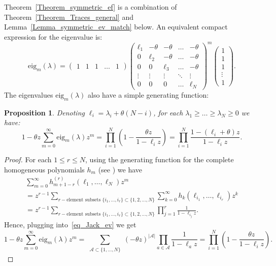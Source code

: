 \documentclass[11pt]{article}
\newtheorem{prop}[theo]{Proposition}
\theoremstyle{definition}
\numberwithin{equation}{section}
\begin{document}
Theorem~\ref{Theorem_symmetric_ef} is a combination of Theorem~\ref{Theorem_Traces_general} and Lemma~\ref{Lemma_symmetric_ev_match} below.
An equivalent compact expression for the eigenvalue is:
\begin{equation}
\label{eq_x7}
 \mathrm{eig}_m(\lambda)=\begin{pmatrix}
1 & 1 & 1 & \ldots & 1
\end{pmatrix}
\begin{pmatrix}
\ell_{1} & -\theta & -\theta & \ldots & -\theta\\
0 & \ell_{2} & -\theta & \ldots & -\theta\\
0 & 0 & \ell_{3} & \ldots & -\theta\\
\vdots & \vdots & \vdots & \ddots & \vdots\\
0 & 0 & 0 & \ldots &  \ell_{N}
\end{pmatrix}
^{m}
\begin{pmatrix}
1\\
1\\
1\\
\vdots\\
1
\end{pmatrix}.
\end{equation}
The eigenvalues $\mathrm{eig}_m(\lambda)$ also have a simple generating function:
\begin{prop} \label{Proposition_sym_gen_funct} Denoting $\ell_i=\lambda_i+\theta(N-i)$, for each $\lambda_1\ge \dots\ge \lambda_N\ge 0$ we have:
\begin{equation}
\label{eq_x8}
 1-\theta z \sum_{m=0}^{\infty}  \mathrm{eig}_m(\lambda) z^m =\prod_{i=1}^N\left(1-\frac{\theta z}{1-\ell_i z}\right)=\prod_{i=1}^{N}\frac{1-(\ell_i+\theta)z}{1-\ell_i z}.
\end{equation}
\end{prop}
\begin{proof}
 For each $1\le r\le N$, using the generating function for the complete homogeneous polynomials $h_m$ (see \cite[Chapter 1, Section 2]{macdonald1998symmetric}) we have
\begin{multline*}
 \sum_{m=0}^{\infty} h^{(r)}_{m+1-r}(\ell_1,\dots,\ell_N) z^m
 \\= z^{r-1} \sum_{r-\text{element subsets }\{i_1,\dots,i_r\}\subset\{1,2,\dots,N\}}\sum_{k=0}^{\infty} h_k(\ell_{i_1},\dots,\ell_{i_r}) z^k
 \\= z^{r-1} \sum_{r-\text{element subsets }\{i_1,\dots,i_r\}\subset\{1,2,\dots,N\}} \prod_{j=1}^r \frac{1}{1-\ell_{i_j}z}.
\end{multline*}
Hence, plugging into~\eqref{eq_Jack_ev} we get
$$
  1-\theta z \sum_{m=0}^{\infty}  \mathrm{eig}_m(\lambda) z^m=
  \sum_{\begin{smallmatrix} \mathcal A\subset \{1,\dots,N\} \end{smallmatrix}}  (-\theta z)^{|\mathcal A|}
   \prod_{a\in \mathcal A} \frac{1}{1-\ell_{a}z}=\prod_{i=1}^N\left(1-\frac{\theta z}{1-\ell_i z}\right).
$$
\end{proof}
\end{document}
